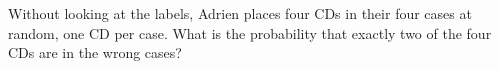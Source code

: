 Without looking at the labels, Adrien places four CDs in their four cases at random, one CD per case. What is the probability that exactly two of the four CDs are in the wrong cases?
